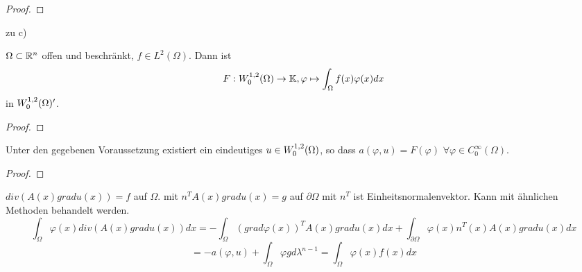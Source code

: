 	\begin{proof}
		\todor	
	\end{proof}

zu c)
	\begin{thm}
		$\Omega \subset \mathbb{R}^n$ offen und beschränkt, $f\in L^2(\Omega)$. Dann ist 
			$$ F: W^{1,2}_0(\Omega) \to \mathbb{K}, \varphi \mapsto \int_\Omega f(x) \varphi(x) dx$$
		in $W^{1,2}_0(\Omega)'$.
	\end{thm}

	\begin{proof}
		\todor	
	\end{proof}

	\begin{cor}
		Unter den gegebenen Voraussetzung existiert ein eindeutiges $u\in W^{1,2}_0(\Omega)$, so dass $a(\varphi, u) = F(\varphi)$ $\forall \varphi \in C^\infty_0(\Omega)$.
	\end{cor}

	\begin{proof}
		\todor	
	\end{proof}

	\begin{bem}
		$div(A(x)grad u(x)) = f$ auf $\Omega$. mit $n^T A(x) grad u(x) = g$ auf $\partial \Omega$	mit $n^T$ ist Einheitsnormalenvektor. Kann mit ähnlichen Methoden behandelt werden.
		$$\int_\Omega \varphi(x) div (A(x) grad u(x)) dx = - \int_\Omega (grad \varphi(x))^T A(x) gradu(x) dx + \int_{\partial\Omega} \varphi(x) n^T(x) A(x) grad u(x) dx$$ 
	$$ = -a(\varphi, u) + \int_\Omega \varphi g d\lambda^{n-1} = \int_\Omega \varphi(x) f(x) dx$$
	\end{bem}

